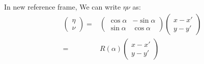 \documentclass[a4paper,12pt]{article}
\begin{document}
\begin{enumerate}
In new reference frame, We can write $\eta \nu$ as:
\begin{align}
 \left(\begin{array}{c}
     \eta\\
      \nu 
    \end{array}\right)=& \left( \begin{array}{cc} \cos \alpha & -\sin \alpha \\
           \sin \alpha & \cos \alpha \end{array} \right)
 \left(\begin{array}{c}
     x-x' \\
     y-y'
    \end{array}\right)\\
=& R(\alpha)\left(\begin{array}{c}
     x-x' \\
     y-y'
    \end{array}\right)
\end{align}


\end{enumerate}
\end{document}
